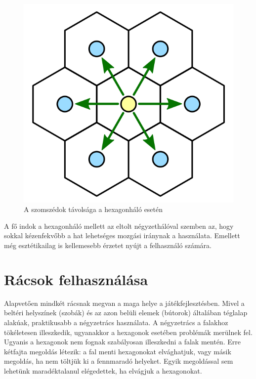 \begin{figure}[h]
\centering
\includegraphics[scale=0.2]{kepek/img23.png}
\caption{A szomszédok távolsága a hexagonháló esetén}
\label{fig:img23}
\end{figure}

\noindent A fő indok a hexagonháló mellett az eltolt négyzethálóval szemben az, hogy sokkal kézenfekvőbb a hat lehetséges mozgási iránynak a használata. Emellett még esztétikailag is kellemesebb érzetet nyújt a felhasználó számára.

\section{Rácsok felhasználása}

Alapvetően mindkét rácsnak megvan a maga helye a játékfejlesztésben. 
\newline
\newline Mivel a beltéri helyszínek (szobák) és az azon belüli elemek (bútorok) általában téglalap alakúak, praktikusabb a négyzetrács használata. A négyzetrács a falakhoz tökéletesen illeszkedik, ugyanakkor a hexagonok esetében problémák merülnek fel. Ugyanis a hexagonok nem fognak szabályosan illeszkedni a falak mentén. Erre kétfajta megoldás létezik: a fal menti hexagonokat elvághatjuk, vagy másik megoldás, ha nem töltjük ki a fennmaradó helyeket. Egyik megoldással sem lehetünk maradéktalanul elégedettek, ha elvágjuk a hexagonokat. 
\newline

